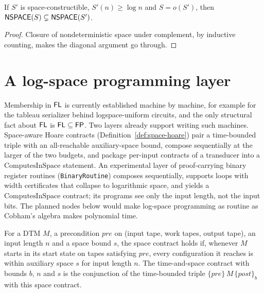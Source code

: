 \begin{theorem}
  \label{thm:space-hierarchy-nondet}
  \notready
  If $S'$ is space-constructible, $S'(n) \ge \log n$ and $S = o(S')$, then
  $\mathsf{NSPACE}(S) \subsetneq \mathsf{NSPACE}(S')$.
\end{theorem}
\begin{proof}
  Closure of nondeterministic space under complement, by inductive counting,
  makes the diagonal argument go through.
\end{proof}

\section{A log-space programming layer}

Membership in $\mathsf{FL}$ is currently established machine by machine, for
example for the tableau serializer behind logspace-uniform circuits, and the
only structural fact about $\mathsf{FL}$ is $\mathsf{FL} \subseteq \mathsf{FP}$. Two
layers already support writing such machines. Space-aware Hoare contracts
(Definition~\ref{def:space-hoare}) pair a time-bounded triple with an
all-reachable auxiliary-space bound, compose sequentially at the larger of the
two budgets, and package per-input contracts of a transducer into a
$\mathrm{ComputesInSpace}$ statement. An experimental layer of proof-carrying
binary register routines (\texttt{BinaryRoutine}) composes sequentially,
supports loops with width certificates that collapse to logarithmic space, and
yields a $\mathrm{ComputesInSpace}$ contract; its programs see only the input
length, not the input bits. The planned nodes below would make log-space
programming as routine as Cobham's algebra makes polynomial time.

\begin{definition}
  \label{def:space-hoare}
  \leanok
  For a DTM $M$, a precondition $\mathit{pre}$ on (input tape, work tapes,
  output tape), an input length $n$ and a space bound $s$, the space contract
  holds if, whenever $M$ starts in its start state on tapes satisfying
  $\mathit{pre}$, every configuration it reaches is within auxiliary space $s$
  for input length $n$. The time-and-space contract with bounds $b$, $n$ and
  $s$ is the conjunction of the time-bounded triple
  $\{\mathit{pre}\}\, M\, \{\mathit{post}\}_b$ with this space contract.
\end{definition}

